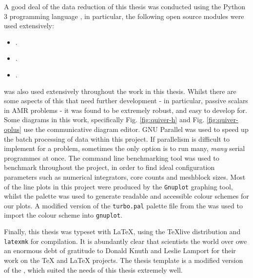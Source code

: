 A good deal of the data reduction of this thesis was conducted using the Python 3 programming language \parencite{10.5555/1593511}, in particular, the following open source modules were used extensively:

\begin{itemize}
  \item {} \parencite{harris2020array}.
  \item {} \parencite{astropy:2013,astropy:2018}.
  \item {} \parencite{Hunter:2007}.
\end{itemize}

\noindent
\athena{} \parencite{athena} was also used extensively throughout the work in this thesis.
Whilst there are some aspects of this that need further development - in particular, passive scalars in AMR problems - it was found to be extremely robust, and easy to develop for.
Some diagrams in this work, specifically Fig. \ref{fig:quiver-h} and Fig. \ref{fig:quiver-oplus} use the  communicative diagram editor.
GNU Parallel \parencite{tange_2021_5523272} was used to speed up the batch processing of data within this project.
If parallelism is difficult to implement for a problem, sometimes the only option is to run many, \textit{many} serial programmes at once.
The  command line benchmarking tool was used to benchmark \athena{} throughout the project, in order to find ideal configuration parameters such as numerical integrators, core counts and meshblock sizes.
Most of the line plots in this project were produced by the \texttt{Gnuplot} graphing tool, whilst the  palette was used to generate readable and accessible colour schemes for our plots.
A modified version of the \texttt{turbo.pal} palette file from the  was used to import the colour scheme into \texttt{gnuplot}.

Finally, this thesis was typeset with \LaTeX{}, using the {\TeX}live distribution and \texttt{latexmk} for compilation.
It is abundantly clear that scientists the world over owe an enormous debt of gratitude to Donald Knuth and Leslie Lamport for their work on the \TeX{} and \LaTeX{} projects.
The thesis template is a modified version of the , which suited the needs of this thesis extremely well.

